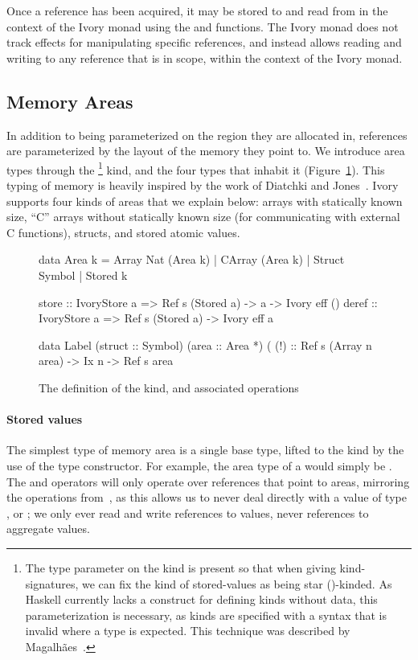 Once a reference has been acquired, it may be stored to and read from in the
context of the Ivory monad using the  and  functions.  The
Ivory monad does not track effects for manipulating specific references, and
instead allows reading and writing to any reference that is in scope, within the
context of the Ivory monad.

\subsection{Memory Areas}
\label{sec:area}

In addition to being parameterized on the region they are allocated in,
references are parameterized by the layout of the memory they point to.  We
introduce area types through the  \footnote{ The type parameter on the
 kind is present so that when giving kind-signatures, we can fix the
kind of stored-values as being star (\cd{*})-kinded.  As Haskell currently lacks
a construct for defining kinds without data, this parameterization is necessary,
as kinds are specified with a syntax that is invalid where a type is expected.
This technique was described by Magalh\~{a}es~\cite{jpm:trkgp:12}.} kind, and
the four types that inhabit it (Figure~\ref{fig:area-def}).  This typing of
memory is heavily inspired by the work of Diatchki and Jones~\cite{memareas}.
Ivory supports four kinds of areas that we explain below: arrays with statically
known size, ``C'' arrays without statically known size (for communicating with
external C functions), structs, and stored atomic values.

\begin{figure}[h]
\begin{code}
data Area k = Array Nat (Area k)
            | CArray (Area k)
            | Struct Symbol
            | Stored k


store :: IvoryStore a
      => Ref s (Stored a) -> a -> Ivory eff ()
deref :: IvoryStore a
      => Ref s (Stored a) -> Ivory eff a

data Label (struct :: Symbol) (area :: Area *)
(%
(!)  :: Ref s (Array n area) -> Ix n -> Ref s area
\end{code}
\caption{The definition of the  kind, and associated operations}
\label{fig:area-def}
\end{figure}

\paragraph{Stored values}
The simplest type of memory area is a single base type, lifted to the 
kind by the use of the  type constructor.  For example, the area type
of a  would simply be . The  and
 operators will only operate over references that point to  areas,
mirroring the operations from~\cite{memareas}, as this allows us to never deal
directly with a value of type , or ; we only ever read and
write references to values, never references to aggregate values.

